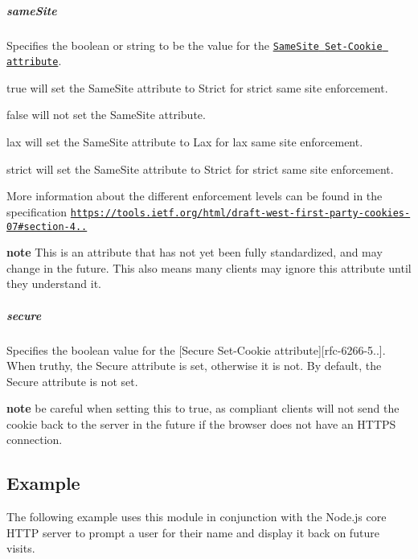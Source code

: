 \subparagraph*{same\+Site}

Specifies the {\ttfamily boolean} or {\ttfamily string} to be the value for the \href{https://tools.ietf.org/html/draft-west-first-party-cookies-07}{\tt {\ttfamily Same\+Site} {\ttfamily Set-\/\+Cookie} attribute}.


\begin{DoxyItemize}
\item {\ttfamily true} will set the {\ttfamily Same\+Site} attribute to {\ttfamily Strict} for strict same site enforcement.
\item {\ttfamily false} will not set the {\ttfamily Same\+Site} attribute.
\item {\ttfamily \textquotesingle{}lax\textquotesingle{}} will set the {\ttfamily Same\+Site} attribute to {\ttfamily Lax} for lax same site enforcement.
\item {\ttfamily \textquotesingle{}strict\textquotesingle{}} will set the {\ttfamily Same\+Site} attribute to {\ttfamily Strict} for strict same site enforcement.
\end{DoxyItemize}

More information about the different enforcement levels can be found in the specification \href{https://tools.ietf.org/html/draft-west-first-party-cookies-07#section-4.1.1}{\tt https\+://tools.\+ietf.\+org/html/draft-\/west-\/first-\/party-\/cookies-\/07\#section-\/4..}

{\bfseries note} This is an attribute that has not yet been fully standardized, and may change in the future. This also means many clients may ignore this attribute until they understand it.

\subparagraph*{secure}

Specifies the {\ttfamily boolean} value for the \mbox{[}{\ttfamily Secure} {\ttfamily Set-\/\+Cookie} attribute\mbox{]}\mbox{[}rfc-\/6266-\/5..\mbox{]}. When truthy, the {\ttfamily Secure} attribute is set, otherwise it is not. By default, the {\ttfamily Secure} attribute is not set.

{\bfseries note} be careful when setting this to {\ttfamily true}, as compliant clients will not send the cookie back to the server in the future if the browser does not have an H\+T\+T\+PS connection.

\subsection*{Example}

The following example uses this module in conjunction with the Node.\+js core H\+T\+TP server to prompt a user for their name and display it back on future visits.


